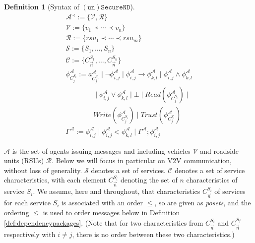 \documentclass[compsoc, conference, letterpaper, 10pt, times]{IEEEtran}
\newtheorem{definition}{Definition}
\begin{document}
\begin{definition}[Syntax of $\mathtt{(un)SecureND}$]\label{def:syntax} %
	\begin{displaymath}
	\begin{array}{l}
	\mathcal{A}^{\prec}:= \{\mathcal{V, R}\}\\
	\mathcal{V}:= \{v_{1}\prec \cdots \prec v_{n}\}\\
	\mathcal{R}:= \{rsu_{1}\prec\cdots \prec rsu_{m}\}\\
	\mathcal{S}:= \{S_1, \dots, S_{n}\}\\  %
	\mathcal{C}:= \{C^{S_1}_{\overrightarrow{n}},  \dots, C^{S_{n}}_{\overrightarrow{n}}\}\\  %
	\phi^{\mathcal{A}}_{C^{S_{i}}_{j}}:= a^{\mathcal{A}}_{C^{S_{i}}_{j}}\mid \neg \phi^{\mathcal{A}}_{i,j}\mid \phi^{\mathcal{A}}_{i,j}\rightarrow \phi^{\mathcal{A}}_{k,l}\mid \phi^{\mathcal{A}}_{i,j}\wedge \phi^{\mathcal{A}}_{k,l}\\
	\qquad \qquad \mid \phi^{\mathcal{A}}_{i,j}\vee \phi^{\mathcal{A}}_{k,l} \mid \bot \mid Read(\phi^{\mathcal{A}}_{C^{S_{i}}_{j}})\mid\\ 
	\qquad \qquad Write(\phi^{\mathcal{A}}_{C^{S_{i}}_{j}})\mid Trust(\phi^{\mathcal{A}}_{C^{S_{i}}_{j}})\\
	\Gamma^{\mathcal{A}}:= 
	\phi^{\mathcal{A}}_{i,j} \mid \phi^{\mathcal{A}}_{i,j} < \phi^{\mathcal{A}}_{k,l} \mid \Gamma^{\mathcal{A}}; \phi^{\mathcal{A}}_{i,j}
	
	\end{array}
	\end{displaymath}
\end{definition}
%

$\mathcal{A}$ is the set of agents issuing messages and including vehicles $\mathcal{V}$ and roadside units (RSUs) $\mathcal{R}$. Below we will focus in particular on V2V communication, without loss of generality. $\mathcal{S}$ denotes a set of services. $\mathcal{C}$ denotes a set of service characteristics, with each element $C^{S_i}_{\overrightarrow{n}}$ denoting the set of $n$ characteristics of service $S_{i}$. We assume, here and throughout, that characteristics $C^{S_i}_{\overrightarrow{n}}$ of services for each service $S_i$ is associated with an order $\leq$, so are given as \emph{posets}, and the ordering $\leq$ is used to order messages below in Definition \ref{def:dependencypackages}. (Note that for two characteristics from $C^{S_i}_{\overrightarrow{n}}$ and $C^{S_j}_{\overrightarrow{n}}$ respectively with $i\neq j$, there is no order between  these two characteristics.)
\end{document}
